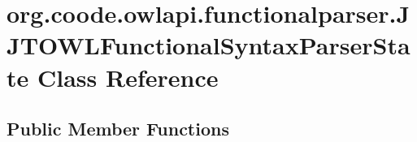 \hypertarget{classorg_1_1coode_1_1owlapi_1_1functionalparser_1_1_j_j_t_o_w_l_functional_syntax_parser_state}{\section{org.\-coode.\-owlapi.\-functionalparser.\-J\-J\-T\-O\-W\-L\-Functional\-Syntax\-Parser\-State Class Reference}
\label{classorg_1_1coode_1_1owlapi_1_1functionalparser_1_1_j_j_t_o_w_l_functional_syntax_parser_state}
}
\subsection*{Public Member Functions}
